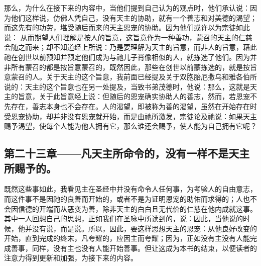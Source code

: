 那么，为什么在接下来的内容中，当他们提到自己认为的观点时，他们承认说：因为他们这样说，仿佛人凭自己，没有天主的协助，就有一个善志和对美德的渴望；而这先有的功劳，堪受随后而来的天主恩宠的协助。因为他们或许以为宗徒如此说： 从而期望人们理解是按人的旨意，这旨意作为一种善功，蒙召的天主的仁慈会随之而来；却不知道经上所说：乃是要理解为天主的旨意，而非人的旨意，藉此祂在创世以前预知并预定他们成为与祂儿子肖像相似的人，就拣选了他们。因为并非所有蒙召的都是按旨意蒙召的，既然因此，那些在创世以前蒙拣选的，就是按旨意蒙召的人。关于天主的这个旨意，我前面已经提及关于双胞胎厄撒乌和雅各伯所说的：天主的这个旨意也在另一处提及，当致书弟茂德时，他说：那么，这就是天主的旨意，关于此旨意经上说：但随后的恩宠确实协助人的善志，然而，若恩宠不先存在，善志本身也不会存在。人的渴望，即被称为善的渴望，虽然在开始存在时受恩宠协助，却并非没有恩宠就开始，而是由祂所激发，宗徒论及祂说：如果天主赐予渴望，使每个人能为他人拥有它，那么谁还会赐予，使人能为自己拥有它呢？\par


\subsection{第二十三章——凡天主所命令的，没有一样不是天主所赐予的。}

既然这些事如此，我看见主在圣经中并没有命令人任何事，为考验人的自由意志，而这件事不是因祂的良善而开始的，或者不是为证明恩宠的助佑而求得的；人也不会因信德的开端而从恶变为善，除非天主的白白且无代价的仁慈在他内成就这事。其中一人回想自己的思想，正如我们在圣咏中所读到的，说：因此，当他说的时候，他并没有说，而是说。所以，因此，要这样思想天主的恩宠：从他良好改变的开始，直到完成的终末，凡夸耀的，应因主而夸耀；因为，正如没有主没有人能完成善事，同样，没有主也没有人能开始善事。但让这成为本书的结束，以便读者的注意力得到更新和加强，为接下来的内容。\par

